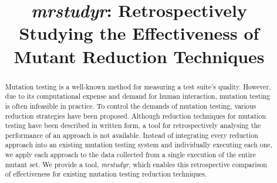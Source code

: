 \documentclass[conference]{IEEEtran}
\newcommand{\mr}{{\it mrstudyr}\xspace}
\begin{document}
\title{\mr: Retrospectively Studying the Effectiveness of Mutant Reduction Techniques}

\author{
\and
{}
\and
{}
}

\maketitle

\begin{abstract}
    Mutation testing is a well-known method for measuring a test suite's quality.
    However, due to its computational expense and demand for human interaction,
    mutation testing is often infeasible in practice. To control the demands of
    mutation testing, various reduction strategies have been proposed.
    Although reduction techniques for mutation testing have been described
    in written form, a tool for retrospectively analysing the performance of
    an approach is not available.
    Instead of integrating every reduction approach into an existing mutation testing system and
    individually executing each one, we apply each approach to the data
    collected from a single execution of the entire mutant set.
    We provide a tool, \mr, which enables this retrospective
    comparison of effectiveness for existing mutation testing reduction techniques.
\end{abstract}

\IEEEpeerreviewmaketitle










\end{document}
